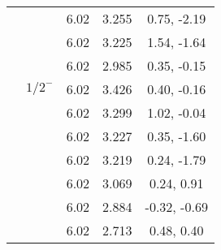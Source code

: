 \documentclass[prd,twocolumn,floatfix,nofootinbib]{revtex4}
\begin{document}
\begin{table*}[!htbp]
\begin{tabular}{ccccc}
            &               &6.02   &3.255  &0.75, -2.19 \\
            &               &6.02   &3.225  &1.54, -1.64 \\
            &               &6.02   &2.985  &0.35, -0.15 \\
            &${1/2}^{-}$    &6.02   &3.426  &0.40, -0.16 \\
            &               &6.02   &3.299  &1.02, -0.04 \\
            &               &6.02   &3.227  &0.35, -1.60 \\
            &               &6.02   &3.219  &0.24, -1.79 \\
            &               &6.02   &3.069  &0.24, 0.91 \\
            &               &6.02   &2.884  &-0.32, -0.69 \\
            &               &6.02   &2.713  &0.48, 0.40 \\
        \hline\hline
    \end{tabular}
\end{table*}
\end{document}
